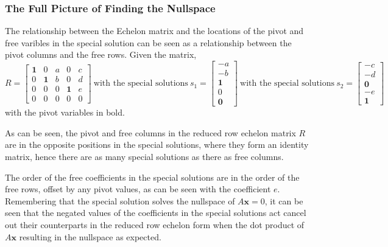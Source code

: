         \subsubsection{The Full Picture of Finding the Nullspace}
            The relationship between the Echelon matrix and the locations of the pivot and free varibles in the special
            solution can be seen as a relationship between the pivot columns and the free rows. Given the matrix,
            \begin{equation}
                R = 
                \begin{bmatrix}
                    \boldsymbol{1} & 0 & a & 0 & c \\
                    0 & \boldsymbol{1} & b & 0 & d \\
                    0 & 0 & 0 & \boldsymbol{1} & e \\
                    0 & 0 & 0 & 0 & 0
                \end{bmatrix}
                \ \textrm{with the special solutions} \ s_1 =
                \begin{bmatrix}
                    -a \\ -b \\ \boldsymbol{1} \\ 0 \\ \boldsymbol{0}
                \end{bmatrix}
                \ \textrm{with the special solutions} \ s_2 =
                \begin{bmatrix}
                    -c \\ -d \\ \boldsymbol{0} \\ -e \\ \boldsymbol{1}
                \end{bmatrix}
            \end{equation}
            with the pivot variables in bold. 

            \par \hfill \break
            As can be seen, the pivot and free columns in the reduced row echelon matrix \(R\) are in the opposite 
            positions in the special solutions, where they form an identity matrix, hence there are as many special
            solutions as there as free columns.

            The order of the free coefficients in the special solutions are in the order of the free rows, offset by 
            any pivot values, as can be seen with the coefficient \(e\). Remembering that the special solution solves 
            the nullspace of \(A\boldsymbol{x}=0\), it can be seen that the negated values of the coefficients in the
            special solutions act cancel out their counterparts in the reduced row echelon form when the dot product of
            \(A\boldsymbol{x}\) resulting in the nullspace as expected.

